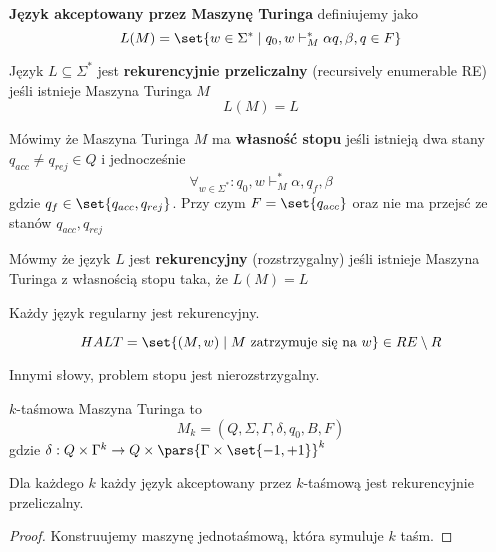 \begin{definition}
	\textbf{Język akceptowany przez Maszynę Turinga} definiujemy jako
	\[
		L(M) = \set{w \in \Sigma^* \mid q_0, w\vdash_M^* \alpha q, \beta, q \in F}
	\]
\end{definition}

\begin{definition}
	Język \( L \subseteq \Sigma^* \) jest \textbf{rekurencyjnie przeliczalny} (recursively enumerable RE) jeśli istnieje Maszyna Turinga \( M \)
	\[
		L(M) = L
	\]
\end{definition}

\begin{definition}
	Mówimy że Maszyna Turinga  \( M \) ma \textbf{własność stopu} jeśli istnieją dwa stany \( q_{acc} \neq q_{rej} \in Q \)
	i jednocześnie \[
		\forall_{w \in \Sigma^*} : q_0, w \vdash_M^* \alpha, q_f, \beta
	\]
	gdzie \( q_f \in \set{q_{acc}, q_{rej}} \).
	Przy czym \( F = \set{q_{acc}} \) oraz nie ma przejsć ze stanów \( q_{acc}, q_{rej} \)
\end{definition}

\begin{definition}
	Mówmy że język \( L \) jest \textbf{rekurencyjny} (rozstrzygalny) jeśli istnieje Maszyna Turinga z własnością stopu taka, że
	\( L(M) = L \)
\end{definition}

\begin{lemma}
	Każdy język regularny jest rekurencyjny.
\end{lemma}
\begin{lemma}
	\[
		HALT = \set{
			(M, w) \mid
			M \text{ zatrzymuje się na } w
		} \in RE \setminus R
	\]
\end{lemma}
Innymi słowy, problem stopu jest nierozstrzygalny.

\begin{definition}
	\(k\)-taśmowa Maszyna Turinga to
	\[
		M_k = (Q, \Sigma, \Gamma, \delta, q_0, B, F)
	\]
	gdzie
	\( \delta : Q \times \Gamma^k \rightarrow Q \times \pars{\Gamma \times \set{-1, +1}}^k\)
\end{definition}

\begin{theorem}
	Dla każdego \( k \) każdy język akceptowany przez \(k\)-taśmową jest rekurencyjnie przeliczalny.
\end{theorem}
\begin{proof}
	Konstruujemy maszynę jednotaśmową, która symuluje \(k\) taśm.
\end{proof}

